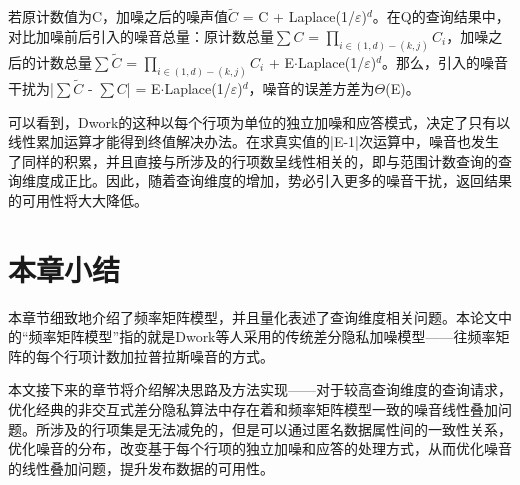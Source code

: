 若原计数值为C，加噪之后的噪声值$\widetilde{C}$ = C + Laplace(1/$\varepsilon$)$^d$。在Q的查询结果中，对比加噪前后引入的噪音总量：原计数总量$\sum{C}$ = \(\prod\nolimits_{i \in (1,d) - (k,j)} {C{_i}} \)，加噪之后的计数总量$\sum{\widetilde{C}}$ = \(\prod\nolimits_{i \in (1,d) - (k,j)} {C{_i}} \) + E$\cdotp$Laplace(1/$\varepsilon$)$^d$。那么，引入的噪音干扰为|$\sum{\widetilde{C}}$ - $\sum{C}$| = E$\cdotp$Laplace(1/$\varepsilon$)$^d$，噪音的误差方差为$\Theta$(E)。

可以看到，Dwork的这种以每个行项为单位的独立加噪和应答模式，决定了只有以线性累加运算才能得到终值解决办法。在求真实值的|E-1|次运算中，噪音也发生了同样的积累，并且直接与所涉及的行项数呈线性相关的，即与范围计数查询的查询维度成正比。因此，随着查询维度的增加，势必引入更多的噪音干扰，返回结果的可用性将大大降低。

\section{本章小结}

本章节细致地介绍了频率矩阵模型，并且量化表述了查询维度相关问题。本论文中的“频率矩阵模型”指的就是Dwork等人采用的传统差分隐私加噪模型——往频率矩阵的每个行项计数加拉普拉斯噪音的方式。

本文接下来的章节将介绍解决思路及方法实现——对于较高查询维度的查询请求，优化经典的非交互式差分隐私算法中存在着和频率矩阵模型一致的噪音线性叠加问题。所涉及的行项集是无法减免的，但是可以通过匿名数据属性间的一致性关系，优化噪音的分布，改变基于每个行项的独立加噪和应答的处理方式，从而优化噪音的线性叠加问题，提升发布数据的可用性。


